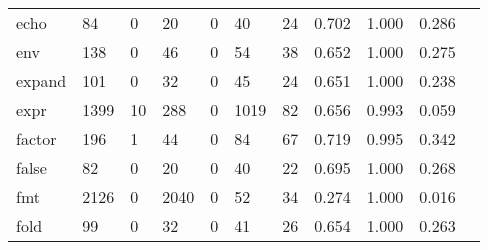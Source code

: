 \begin{longtable}{lp{1.10cm}p{1.10cm}p{1.10cm}p{1.10cm}p{1.10cm}p{1.10cm}p{1.10cm}p{1.10cm}p{1.10cm}p{1.10cm}}
echo      &                     84 &                                  0 &                                20 &                                0 &                                40 &                              24 &                          0.702 &                                 1.000 &                               0.286 \\
env       &                    138 &                                  0 &                                46 &                                0 &                                54 &                              38 &                          0.652 &                                 1.000 &                               0.275 \\
expand    &                    101 &                                  0 &                                32 &                                0 &                                45 &                              24 &                          0.651 &                                 1.000 &                               0.238 \\
expr      &                   1399 &                                 10 &                               288 &                                0 &                              1019 &                              82 &                          0.656 &                                 0.993 &                               0.059 \\
factor    &                    196 &                                  1 &                                44 &                                0 &                                84 &                              67 &                          0.719 &                                 0.995 &                               0.342 \\
false     &                     82 &                                  0 &                                20 &                                0 &                                40 &                              22 &                          0.695 &                                 1.000 &                               0.268 \\
fmt       &                   2126 &                                  0 &                              2040 &                                0 &                                52 &                              34 &                          0.274 &                                 1.000 &                               0.016 \\
fold      &                     99 &                                  0 &                                32 &                                0 &                                41 &                              26 &                          0.654 &                                 1.000 &                               0.263 \\

\end{longtable}
